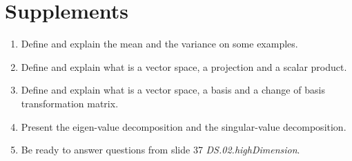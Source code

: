 \documentclass[a4paper]{article}
\begin{document}
% 
% 

\section*{Supplements}
\begin{enumerate}
    \item Define and explain the mean and the variance on some examples.
    \item Define and explain what is a vector space, a projection and a scalar product.
    \item Define and explain what is a vector space, a basis and a change of basis
transformation matrix.
    \item Present the eigen-value decomposition and the singular-value decomposition.
    \item Be ready to answer questions from slide 37 \textit{DS.02.highDimension}.
\end{enumerate}


%
\end{document}
